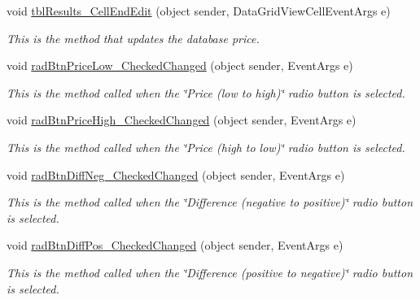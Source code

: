 \begin{DoxyCompactItemize}
\item 
void \hyperlink{class_price_comparison_form_1_1_form_price_compare_ae3404e34f7004363d8b1d95ab9de37aa}{tbl\-Results\-\_\-\-Cell\-End\-Edit} (object sender, Data\-Grid\-View\-Cell\-Event\-Args e)
\begin{DoxyCompactList}\small\item\em This is the method that updates the database price. \end{DoxyCompactList}\item 
void \hyperlink{class_price_comparison_form_1_1_form_price_compare_ac56367c7334500e086c4868654526126}{rad\-Btn\-Price\-Low\-\_\-\-Checked\-Changed} (object sender, Event\-Args e)
\begin{DoxyCompactList}\small\item\em This is the method called when the \char`\"{}\-Price (low to high)\char`\"{} radio button is selected. \end{DoxyCompactList}\item 
void \hyperlink{class_price_comparison_form_1_1_form_price_compare_a6d367394c18b60c3b4bd1fad4c90e76c}{rad\-Btn\-Price\-High\-\_\-\-Checked\-Changed} (object sender, Event\-Args e)
\begin{DoxyCompactList}\small\item\em This is the method called when the \char`\"{}\-Price (high to low)\char`\"{} radio button is selected. \end{DoxyCompactList}\item 
void \hyperlink{class_price_comparison_form_1_1_form_price_compare_aec6b5fe875e34f483f07d3fa1c3f6aef}{rad\-Btn\-Diff\-Neg\-\_\-\-Checked\-Changed} (object sender, Event\-Args e)
\begin{DoxyCompactList}\small\item\em This is the method called when the \char`\"{}\-Difference (negative to positive)\char`\"{} radio button is selected. \end{DoxyCompactList}\item 
void \hyperlink{class_price_comparison_form_1_1_form_price_compare_aa9c0ef3d383d9ce964737fb6c2cede35}{rad\-Btn\-Diff\-Pos\-\_\-\-Checked\-Changed} (object sender, Event\-Args e)
\begin{DoxyCompactList}\small\item\em This is the method called when the \char`\"{}\-Difference (positive to negative)\char`\"{} radio button is selected. \end{DoxyCompactList}\item 

\end{DoxyCompactItemize}

